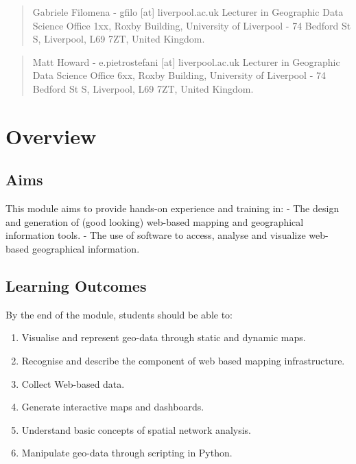 \documentclass[
  letterpaper,
  DIV=11,
  numbers=noendperiod]{scrreprt}
\providecommand{\tightlist}{%
  \setlength{\itemsep}{0pt}\setlength{\parskip}{0pt}}\usepackage{longtable,booktabs,array}
\begin{document}

\begin{quote}
Gabriele Filomena - gfilo {[}at{]} liverpool.ac.uk Lecturer in
Geographic Data Science Office 1xx, Roxby Building, University of
Liverpool - 74 Bedford St S, Liverpool, L69 7ZT, United Kingdom.
\end{quote}

\begin{quote}
Matt Howard - e.pietrostefani {[}at{]} liverpool.ac.uk Lecturer in
Geographic Data Science Office 6xx, Roxby Building, University of
Liverpool - 74 Bedford St S, Liverpool, L69 7ZT, United Kingdom.
\end{quote}

\section*{Overview}\label{overview}


\subsection*{Aims}\label{aims}

This module aims to provide hands-on experience and training in: - The
design and generation of (good looking) web-based mapping and
geographical information tools. - The use of software to access, analyse
and visualize web-based geographical information.

\subsection*{Learning Outcomes}\label{learning-outcomes}

By the end of the module, students should be able to:

\begin{enumerate}
\def\labelenumi{(\arabic{enumi})}
\setcounter{enumi}{1}
\tightlist
\item
  Visualise and represent geo-data through static and dynamic maps.
\item
  Recognise and describe the component of web based mapping
  infrastructure.
\item
  Collect Web-based data.
\item
  Generate interactive maps and dashboards.
\item
  Understand basic concepts of spatial network analysis.
\item
  Manipulate geo-data through scripting in Python.
\end{enumerate}
\end{document}
